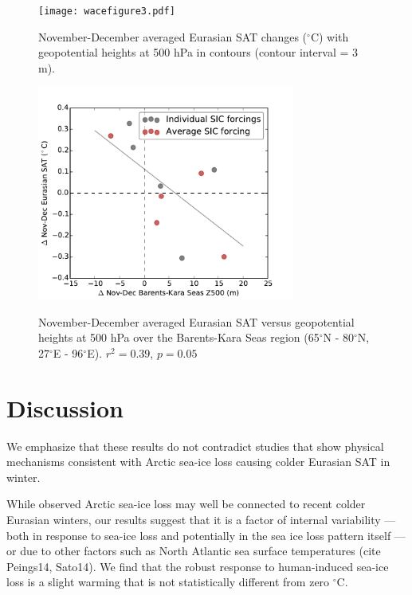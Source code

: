 \documentclass[grl]{AGUTeX}  %
\begin{document}
\begin{article}
\begin{figure}[t]
  \noindent\texttt{[image: wacefigure3.pdf]} \\ 
  \caption{November-December averaged Eurasian SAT changes ($^\circ$C) with geopotential heights at 500 hPa in contours (contour interval = 3 m).
}\label{fig:fig3}
\end{figure} %

\begin{figure}[t]
  \noindent\includegraphics[width=20pc,angle=0]{fig4.pdf} \\ 
  \caption{November-December averaged Eurasian SAT versus geopotential heights at 500 hPa over the Barents-Kara Seas region (65$^\circ$N - 80$^\circ$N, 27$^\circ$E - 96$^\circ$E). $r^2 = 0.39$, $p = 0.05$
}\label{fig:fig4}
\end{figure}

\section{Discussion}

We emphasize that these results do not contradict studies that show physical mechanisms consistent with Arctic sea-ice loss causing colder Eurasian SAT in winter. 

While observed Arctic sea-ice loss may well be connected to recent colder Eurasian winters, our results suggest that it is a factor of internal variability --- both in response to sea-ice loss and potentially in the sea ice loss pattern itself --- or due to other factors such as North Atlantic sea surface temperatures (cite Peings14, Sato14). We find that the robust response to human-induced sea-ice loss is a slight warming that is not statistically different from zero $^\circ$C.


\end{article}
\end{document}
